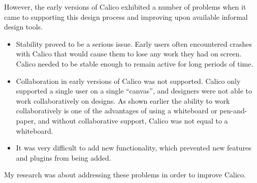 However, the early versions of Calico exhibited a number of problems when it came to supporting this design process and improving upon available informal design tools.
\begin{itemize}\itemsep1pt
\item 
Stability proved to be a serious issue. 
Early users often encountered crashes with Calico that would cause them to lose any work they had on screen. 
Calico needed to be stable enough to remain active for long periods of time.

\item 
Collaboration in early versions of Calico was not supported. 
Calico only supported a single user on a single ``canvas'', and designers were not able to work collaboratively on designs. 
As shown earlier the ability to work collaboratively is one of the advantages of using a whiteboard or pen-and-paper, and without collaborative support, Calico was not equal to a whiteboard.

\item
It was very difficult to add new functionality, which prevented new features and plugins from being added. 

\end{itemize}
My research was about addressing these problems in order to improve Calico.





